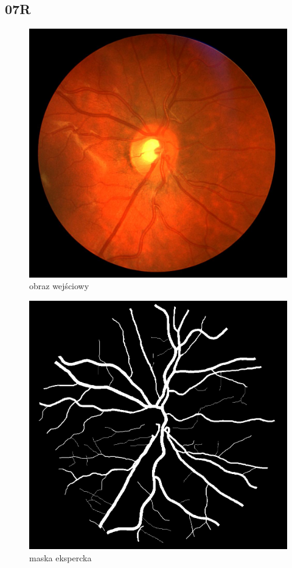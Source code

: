 \documentclass[polish,polish,a4paper]{article}
\begin{document}






		\subsection{07R}
		
\begin{figure}[!h]
	\centering
	\begin{minipage}{0.26\linewidth}
		\includegraphics[width=\linewidth]{../chase/Image_07R.jpg}
		\centering
			\small{obraz wejściowy}
	\end{minipage}
	\hfill
	\begin{minipage}{0.26\linewidth}
		\includegraphics[width=\linewidth]{../chase/Image_07R_1stHO.png}
		\centering
			\small{maska ekspercka}
	\end{minipage}
\end{figure}
\end{document}
